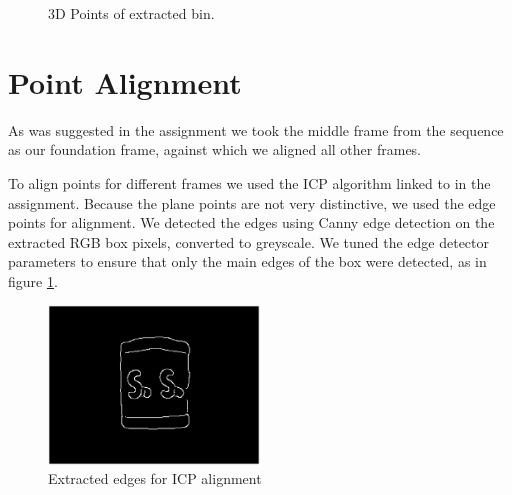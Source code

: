 \documentclass[12pt,a4paper,onecolumn]{article}
\begin{document}
\begin{figure}[!h]
    \centering
      \caption{3D Points of extracted bin.}
\end{figure}

\section{Point Alignment}
As was suggested in the assignment we took the middle frame
from the sequence as our foundation frame, against which we aligned all other frames.

To align points for different frames we used the ICP algorithm
linked to in the assignment.  Because the plane points are not very distinctive, we used the edge points for alignment.  We detected the edges using Canny edge detection on the extracted RGB box pixels, converted to greyscale.  We tuned the edge detector parameters to ensure that only the main edges of the box were detected, as in figure \ref{fig:extracted_edge_mask}.

\begin{figure}[h]
  \centering
  \includegraphics[width=0.5\textwidth]{figs/extracted_edge_mask}
  \caption{Extracted edges for ICP alignment}
  \label{fig:extracted_edge_mask}
\end{figure}
\end{document}
